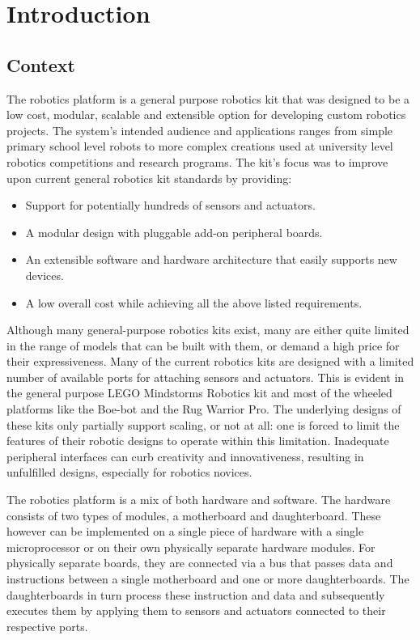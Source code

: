 \chapter{Introduction} 


\section{Context}
The \xten robotics platform is a general purpose robotics kit that was designed to be a low cost, modular, scalable and extensible option for developing custom robotics projects. The system's intended audience and applications ranges from simple primary school level robots to more complex creations used at university level robotics competitions and research programs. The \xten kit's focus was to improve upon current general robotics kit standards by providing:
\begin{itemize}
\item Support for potentially hundreds of sensors and actuators.
\item A modular design with pluggable add-on peripheral boards.
\item An extensible software and hardware architecture that easily supports new devices.
\item A low overall cost while achieving all the above listed requirements.
\end{itemize}

Although many general-purpose robotics kits exist, many are either quite limited in the range of models that can be built with them, or demand a high price for their expressiveness. Many of the current robotics kits are designed with a limited number of available ports for attaching sensors and actuators. This is evident in the general purpose LEGO Mindstorms Robotics kit and most of the wheeled platforms like the Boe-bot and the Rug Warrior Pro. %
The underlying designs of these kits only partially support scaling, or not at all: one is forced to limit the features of their robotic designs to operate within this limitation. Inadequate peripheral interfaces can curb creativity and innovativeness, resulting in unfulfilled designs, especially for robotics novices.

The \xten robotics platform is a mix of both hardware and software. The hardware consists of two types of modules, a motherboard and daughterboard. These however can be implemented on a single piece of hardware with a single microprocessor or on their own physically separate hardware modules. For physically separate boards, they are connected via a bus that passes data and instructions between a single motherboard and one or more daughterboards. The daughterboards in turn process these instruction and data and subsequently executes them by applying them to sensors and actuators connected to their respective ports.

